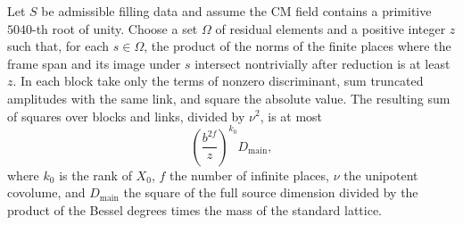 \begin{lemma}
\label{lem:b-link-meet}
\emitthmsource
Let $S$ be admissible filling data and assume the CM field contains a primitive $5040$-th root of unity.
Choose a set $\Omega$ of residual elements and a positive integer $z$ such that, for each $s\in\Omega$,
the product of the norms of the finite places where the frame span and its image under $s$ intersect nontrivially after reduction is at least $z$.
In each block take only the terms of nonzero discriminant, sum truncated amplitudes with the same link, and square the absolute value.
The resulting sum of squares over blocks and links, divided by $\nu^2$, is at most
\[
 \left(\frac{b^{2f}}{z}\right)^{k_0}D_{\mathrm{main}},
\]
where $k_0$ is the rank of $X_0$, $f$ the number of infinite places, $\nu$ the unipotent covolume, and
$D_{\mathrm{main}}$ the square of the full source dimension divided by the product of the Bessel degrees times the mass of the standard lattice.
\end{lemma}
